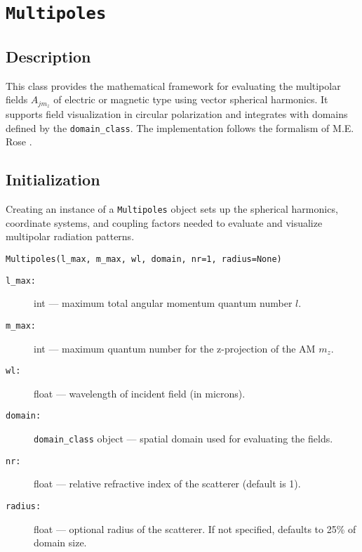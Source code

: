 \section{\texttt{Multipoles}}

\subsection{Description}
This class provides the mathematical framework for evaluating the multipolar fields \( A_{j m_z} \) of electric or magnetic type using vector spherical harmonics. It supports field visualization in circular polarization and integrates with domains defined by the \texttt{domain\_class}. The implementation follows the formalism of M.E. Rose \cite{rose}.

\subsection{Initialization}
Creating an instance of a \texttt{Multipoles} object sets up the spherical harmonics, coordinate systems, and coupling factors needed to evaluate and visualize multipolar radiation patterns.

\begin{verbatim}
Multipoles(l_max, m_max, wl, domain, nr=1, radius=None)
\end{verbatim}

\begin{description}
    \item[\texttt{l\_max:}] int — maximum total angular momentum quantum number \( l \).
    \item[\texttt{m\_max:}] int — maximum quantum number for the z-projection of the AM \( m_z \).
    \item[\texttt{wl:}] float — wavelength of incident field (in microns).
    \item[\texttt{domain:}] \texttt{domain\_class} object — spatial domain used for evaluating the fields.
    \item[\texttt{nr:}] float — relative refractive index of the scatterer (default is 1).
    \item[\texttt{radius:}] float — optional radius of the scatterer. If not specified, defaults to 25\% of domain size.
\end{description}

